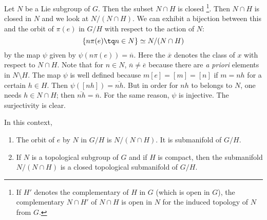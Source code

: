 Let $N$ be a Lie subgroup of $G$. Then the subset $N\cap H$ is closed
\footnote{If $H'$ denotes the complementary of $H$ in $G$ (which is open in $G$), the complementary $N\cap H'$ of $N\cap H$ is open in $N$ for the induced topology of $N$ from $G$.}. Then $N\cap H$ is closed in $N$ and we look at $N/(N\cap H)$. We can exhibit a bijection between this and the orbit of $\pi(e)$ in $G/H$ with respect to the action of $N$:
\begin{equation}
  \{ n\pi(e)\tq n\in N \}\simeq N/(N\cap H)
\end{equation}
by the map $\psi$ given by $\psi(n\pi(e))=\overline{n}$. Here the $\overline{ x }$ denotes the class of $x$ with respect to $N\cap H$. Note that for $n\in N$, $\overline{n}\neq\overline{e}$ because there are \emph{a priori} elements in $N\setminus H$. The map $\psi$ is well defined because $m[e]=[m]=[n]$ if $m=nh$ for a certain $h\in H$. Then $\psi([nh])=\overline{nh}$. But in order for $nh$ to belongs to $N$, one needs $h\in N\cap H$; then $\overline{nh}=\overline{n}$. For the same reason, $\psi$ is injective. The surjectivity is clear.

\begin{proposition}			\label{prop:orbit_N_ss_var}
	In this context,
	\begin{enumerate}
		\item The orbit of $e$ by $N$ in $G/H$ is $N/(N\cap H)$. It is submanifold of $G/H$.
		\item If $N$ is a topological subgroup of $G$ and if $H$ is compact, then the submanifold $N/(N\cap H)$ is a closed topological submanifold of $G/H$.
	\end{enumerate}
\end{proposition}

